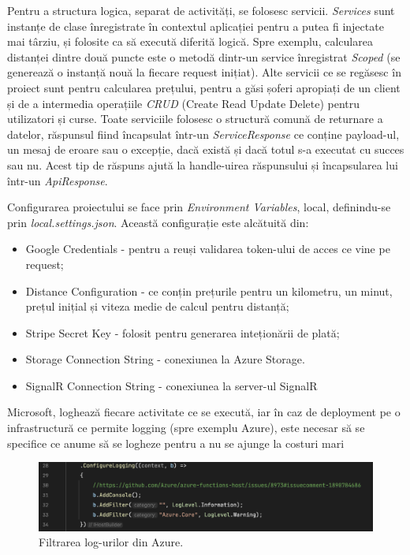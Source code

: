 Pentru a structura logica, separat de activități, se folosesc servicii. \textit{Services} sunt instanțe de clase înregistrate în
contextul aplicației pentru a putea fi injectate mai târziu, și folosite ca să execută diferită logică.
Spre exemplu, calcularea distanței dintre două puncte este o metodă dintr-un service înregistrat \textit{Scoped} (se generează o instanță nouă
la fiecare request inițiat). Alte servicii ce se regăsesc în proiect sunt pentru calcularea prețului, pentru 
a găsi șoferi apropiați de un client și de a intermedia operațiile \textit{CRUD} (Create Read Update Delete) pentru utilizatori și curse.
Toate serviciile folosesc o structură comună de returnare a datelor, răspunsul fiind încapsulat într-un \textit{ServiceResponse}
ce conține payload-ul, un mesaj de eroare sau o excepție, dacă există și dacă totul s-a executat cu succes sau nu. Acest tip de răspuns
ajută la handle-uirea răspunsului și încapsularea lui într-un \textit{ApiResponse}.

Configurarea proiectului se face prin \textit{Environment Variables}, local, definindu-se prin
\textit{local.settings.json}. Această configurație este alcătuită din:
\begin{itemize}
    \item Google Credentials - pentru a reuși validarea token-ului de acces ce vine pe request;
    \item Distance Configuration - ce conțin prețurile pentru un kilometru, un minut, prețul inițial și viteza medie de calcul pentru distanță;
    \item Stripe Secret Key - folosit pentru generarea inteționării de plată;
    \item Storage Connection String - conexiunea la Azure Storage.
    \item SignalR Connection String - conexiunea la server-ul SignalR
\end{itemize}

Microsoft, loghează fiecare activitate ce se execută, iar în caz de deployment pe o infrastructură ce permite logging (spre exemplu Azure),
este necesar să se specifice ce anume să se logheze pentru a nu se ajunge la costuri mari
\begin{figure}[H]
    \centering
    \includegraphics[width=14cm]{Assets/configLogging.png}
    \caption{Filtrarea log-urilor din Azure.}
    \label{fig:configLogging}
\end{figure}

